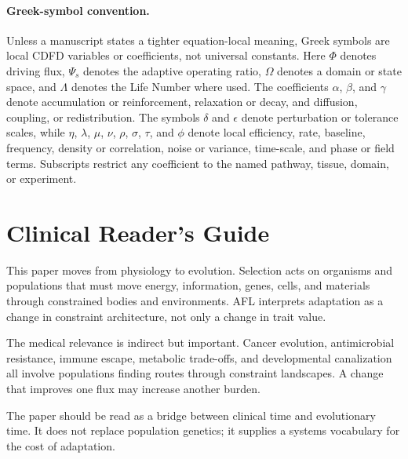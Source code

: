 \documentclass[11pt]{article}
\begin{document}
\paragraph{Greek-symbol convention.}
Unless a manuscript states a tighter equation-local meaning, Greek symbols are local CDFD variables or coefficients, not universal constants. Here $\Phi$ denotes driving flux, $\Psi_s$ denotes the adaptive operating ratio, $\Omega$ denotes a domain or state space, and $\Lambda$ denotes the Life Number where used. The coefficients $\alpha$, $\beta$, and $\gamma$ denote accumulation or reinforcement, relaxation or decay, and diffusion, coupling, or redistribution. The symbols $\delta$ and $\epsilon$ denote perturbation or tolerance scales, while $\eta$, $\lambda$, $\mu$, $\nu$, $\rho$, $\sigma$, $\tau$, and $\phi$ denote local efficiency, rate, baseline, frequency, density or correlation, noise or variance, time-scale, and phase or field terms. Subscripts restrict any coefficient to the named pathway, tissue, domain, or experiment.

\section*{Clinical Reader's Guide}
This paper moves from physiology to evolution. Selection acts on organisms and populations that must move energy, information, genes, cells, and materials through constrained bodies and environments. AFL interprets adaptation as a change in constraint architecture, not only a change in trait value.

The medical relevance is indirect but important. Cancer evolution, antimicrobial resistance, immune escape, metabolic trade-offs, and developmental canalization all involve populations finding routes through constraint landscapes. A change that improves one flux may increase another burden.

The paper should be read as a bridge between clinical time and evolutionary time. It does not replace population genetics; it supplies a systems vocabulary for the cost of adaptation.


\vspace{0.5em}\noindent{}
\vspace{0.75em}
\end{document}
